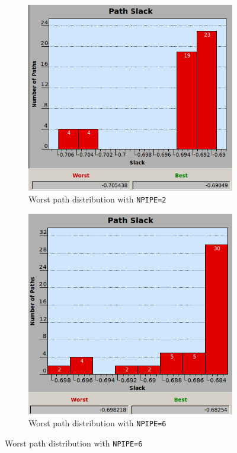 \begin{figure}[htbp]
    \begin{subfigure}{0.5\textwidth}
	   \centering
	   \includegraphics[width=\textwidth]{chapter1/images/npipe2.png}
	   \caption{Worst path distribution with \texttt{NPIPE=2}}
	   \label{fig:hist2}
    \end{subfigure}
    \begin{subfigure}{0.5\textwidth}
        \centering
	    \includegraphics[width=\textwidth]{chapter1/images/npipe6.png}
	    \caption{Worst path distribution with \texttt{NPIPE=6}}
	    \label{fig:hist6}
	\end{subfigure}
\end{figure}
